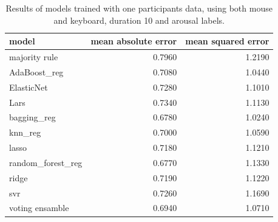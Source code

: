 \documentclass[../main.tex]{subfiles}
\begin{document}
\begin{table}[!h]
    \centering
    \begin{tabular}{lrr}
        \toprule
                     model &  mean absolute error &  mean squared error \\
        \midrule
             majority rule &               0.7960 &              1.2190 \\
              AdaBoost\_reg &               0.7080 &              1.0440 \\
                ElasticNet &               0.7280 &              1.1010 \\
                      Lars &               0.7340 &              1.1130 \\
               bagging\_reg &               0.6780 &              1.0240 \\
                   knn\_reg &               0.7000 &              1.0590 \\
                     lasso &               0.7180 &              1.1210 \\
         random\_forest\_reg &               0.6770 &              1.1330 \\
                     ridge &               0.7190 &              1.1220 \\
                       svr &               0.7260 &              1.1690 \\
           voting ensamble &               0.6940 &              1.0710 \\
        \bottomrule
    \end{tabular}   
    \caption{Results of models trained with one participants data, using both mouse and keyboard, duration 10 and arousal labels.}     
\end{table}
\end{document}

